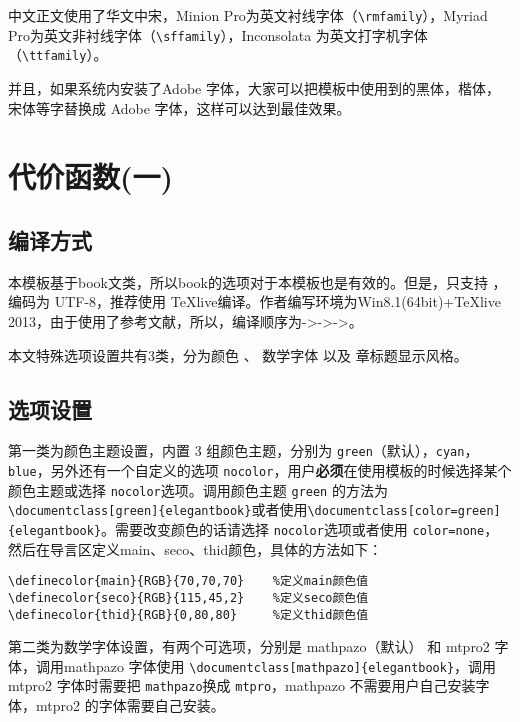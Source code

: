 \begin{note}
中文正文使用了华文中宋，Minion Pro为英文衬线字体（\verb|\rmfamily|），Myriad Pro为英文非衬线字体（\verb|\sffamily|），Inconsolata 为英文打字机字体（\verb|\ttfamily|）。

并且，如果系统内安装了Adobe 字体，大家可以把模板中使用到的黑体，楷体，宋体等字替换成 Adobe 字体，这样可以达到最佳效果。
\end{note}

\section{代价函数(一)}
\subsection{编译方式}
本模板基于book文类，所以book的选项对于本模板也是有效的。但是，只支持 \XeLaTeX{}，编码为 UTF-8，推荐使用 \TeX{}live编译。作者编写环境为Win8.1(64bit)+\TeX{}live 2013，由于使用了参考文献，所以，编译顺序为\XeLaTeX->\BibTeX->\XeLaTeX->\XeLaTeX。

本文特殊选项设置共有3类，分为{\color{main}颜色} 、{\color{main} 数学字体 }以及{\color{main} 章标题显示风格}。

\subsection{选项设置}
第一类为{\color{main}颜色}主题设置，内置 3 组颜色主题，分别为 \verb|green|（默认），\verb|cyan|，\verb|blue|，另外还有一个自定义的选项 \verb|nocolor|，用户\textbf{必须}在使用模板的时候选择某个颜色主题或选择 \verb|nocolor|选项。调用颜色主题 \verb|green| 的方法为\verb|\documentclass[green]{elegantbook}|或者使用\verb|\documentclass[color=green]{elegantbook}|。需要改变颜色的话请选择 \verb|nocolor|选项或者使用 \verb|color=none|，然后在导言区定义main、seco、thid颜色，具体的方法如下：
\begin{verbatim}
\definecolor{main}{RGB}{70,70,70}    %定义main颜色值
\definecolor{seco}{RGB}{115,45,2}    %定义seco颜色值
\definecolor{thid}{RGB}{0,80,80}     %定义thid颜色值
\end{verbatim}

第二类为{\color{main}数学字体}设置，有两个可选项，分别是 mathpazo（默认） 和 mtpro2 字体，调用mathpazo 字体使用 \verb|\documentclass[mathpazo]{elegantbook}|，调用 mtpro2 字体时需要把 \verb|mathpazo|换成 \verb|mtpro|，mathpazo 不需要用户自己安装字体，mtpro2 的字体需要自己安装。

